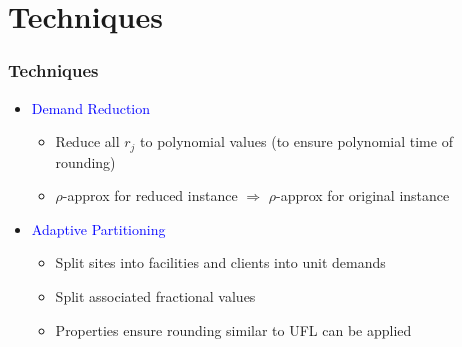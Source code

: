 \documentclass[hyperref,dvipsnames,svgnames,compress]{beamer}
\begin{document}

\section[Techniques]{Techniques}

\begin{frame}
  \frametitle{Techniques}

  \begin{itemize}\addtolength{\itemsep}{2\baselineskip}

  \item {\Large \textcolor{blue}{Demand Reduction}}
    \vspace{.1in}
    \begin{itemize}\addtolength{\itemsep}{1\baselineskip}
    \item {\large Reduce all $r_j$ to polynomial values (to ensure polynomial time of
						rounding)}
    \item {\large $\rho$-approx for reduced instance $\Rightarrow$ $\rho$-approx for original instance }
    \end{itemize}
    
  \item {\Large \textcolor{blue}{Adaptive Partitioning}}
    \vspace{.1in}
    \begin{itemize}\addtolength{\itemsep}{1\baselineskip}
    \item {\large Split sites into facilities and clients into unit demands}
    \item {\large Split associated fractional values}
    \item {\large Properties ensure rounding similar to UFL can be applied}
    \end{itemize}
  \end{itemize}
\end{frame}
\end{document}
